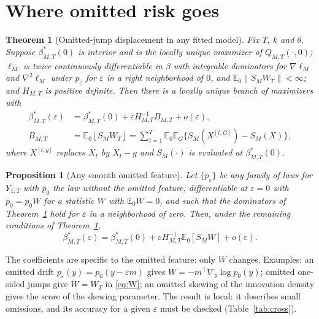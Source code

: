 \documentclass[11pt,a4paper]{article}
\newtheorem{theorem}{Theorem}
\newtheorem{proposition}{Proposition}
\theoremstyle{definition}
\theoremstyle{remark}
\newcommand{\E}{\mathbb{E}}
\newcommand{\tr}{^{\top}}
\begin{document}
\section{Where omitted risk goes}\label{sec:where}
\begin{theorem}[Omitted-jump displacement in any fitted model]\label{thm:displacement}
Fix $T$, $k$ and $\theta$. Suppose $\beta^*_{M,T}(0)$ is interior and is the locally unique maximizer of $Q_{M,T}(\cdot,0)$; $\ell_M$ is twice continuously differentiable in $\beta$ with integrable dominators for $\nabla\ell_M$ and $\nabla^2\ell_M$ under $p_\varepsilon$ for $\varepsilon$ in a right neighborhood of $0$, and $\E_0\|S_MW_T\|<\infty$; and $H_{M,T}$ is positive definite. Then there is a locally unique branch of maximizers with
\begin{equation}\label{eq:displacement}
\begin{aligned}
\beta^*_{M,T}(\varepsilon)&=\beta^*_{M,T}(0)+\varepsilon H_{M,T}^{-1}B_{M,T}+o(\varepsilon),\\
B_{M,T}&=\E_0[S_MW_T]=\sum_{t=1}^T\E_0\E_G\big\{S_M(X^{[t,G]})-S_M(X)\big\},
\end{aligned}
\end{equation}
where $X^{[t,g]}$ replaces $X_t$ by $X_t-g$ and $S_M(\cdot)$ is evaluated at $\beta^*_{M,T}(0)$.
\end{theorem}


\begin{proposition}[Any smooth omitted feature]\label{prop:general}
Let $\{p_\varepsilon\}$ be any family of laws for $Y_{1:T}$ with $p_0$ the law without the omitted feature, differentiable at $\varepsilon=0$ with $\dot p_0=p_0W$ for a statistic $W$ with $\E_0W=0$, and such that the dominators of Theorem~\ref{thm:displacement} hold for $\varepsilon$ in a neighborhood of zero. Then, under the remaining conditions of Theorem~\ref{thm:displacement},
\[
\beta^*_{M,T}(\varepsilon)=\beta^*_{M,T}(0)+\varepsilon H_{M,T}^{-1}\E_0[S_MW]+o(\varepsilon).
\]
\end{proposition}

\noindent The coefficients are specific to the omitted feature: only $W$ changes. Examples: an omitted drift $p_\varepsilon(y)=p_0(y-\varepsilon m)$ gives $W=-m\tr\nabla_y\log p_0(y)$; omitted one-sided jumps give $W=W_T$ in \eqref{eq:W}; an omitted skewing of the innovation density gives the score of the skewing parameter. The result is local: it describes small omissions, and its accuracy for a given $\varepsilon$ must be checked (Table~\ref{tab:cross}).
\end{document}
